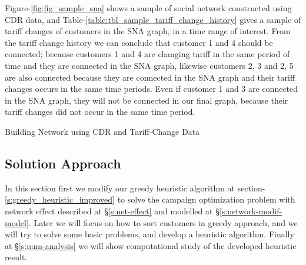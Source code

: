 \documentclass[11pt]{article}
\begin{document}
Figure-\ref{fig:fig_sample_sna} shows a sample of social network constructed using CDR data, and Table-\ref{table:tbl_sample_tariff_change_history} gives a sample of tariff changes of customers in the SNA graph, in a time range of interest. From the tariff change history we can conclude that customer 1 and 4 should be connected; because customers 1 and 4 are changing tariff in the same period of time and they are connected in the SNA graph, likewise customers 2, 3 and 2, 5 are also connected because they are connected in the SNA graph and their tariff changes occurs in the same time periods. Even if customer 1 and 3 are connected in the SNA graph, they will not be connected in our final graph, because their tariff changes did not occur in the same time period.
\\
\begin{algorithm}[H]
\DontPrintSemicolon
{}
\;
\caption{Building Network using CDR and Tariff-Change Data}
\label{algo:building-net-cdr-and-tariff-change}
\end{algorithm}


\subsection{Solution Approach}
In this section first we modify our greedy heuristic algorithm at section-\ref{s:greedy_heuristic_improved} to solve the campaign optimization problem with network effect described at \S \ref{s:net-effect} and modelled at \S \ref{s:network-modif-model}. Later we will focus on how to sort customers in greedy approach, and we will try to solve some basic problems, and develop a heuristic algorithm. Finally at \S \ref{s:num-analysis} we will show computational study of the developed heuristic  result.
\end{document}
